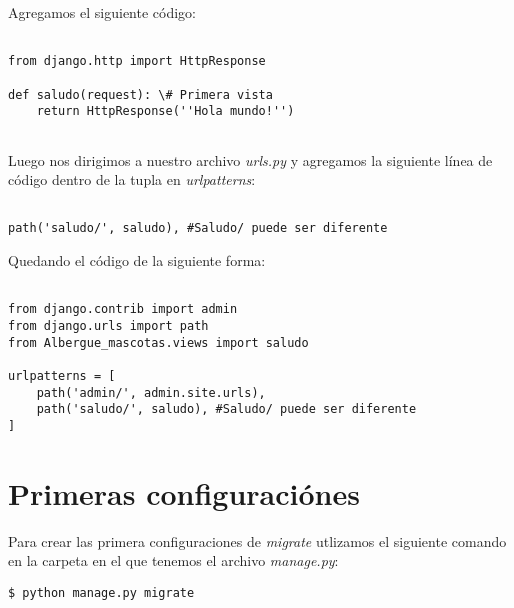 \documentclass[12pt,letterpaper]{article}
\begin{document}
Agregamos el siguiente código:\\



\lstset{language=python, breaklines=true, basicstyle=\footnotesize}
\begin{lstlisting}[frame=single]

from django.http import HttpResponse

def saludo(request): \# Primera vista
    return HttpResponse(''Hola mundo!'')
    
\end{lstlisting}




Luego nos dirigimos a nuestro archivo \emph{urls.py} y agregamos la siguiente línea de código dentro de la tupla en \emph{urlpatterns}:




\lstset{language=python, breaklines=true, basicstyle=\footnotesize}
\begin{lstlisting}[frame=single]

path('saludo/', saludo), #Saludo/ puede ser diferente

\end{lstlisting}

Quedando el código de la siguiente forma:\\

\lstset{language=python, breaklines=true, basicstyle=\footnotesize}
\begin{lstlisting}[frame=single]

from django.contrib import admin
from django.urls import path
from Albergue_mascotas.views import saludo

urlpatterns = [
    path('admin/', admin.site.urls),
    path('saludo/', saludo), #Saludo/ puede ser diferente
]

\end{lstlisting}

\section{Primeras configuraciónes}

Para crear las primera configuraciones de \emph{migrate} utlizamos el siguiente comando en la carpeta en el que tenemos el archivo \emph{manage.py}:\\

\begin{verbatim}
$ python manage.py migrate
\end{verbatim}
\end{document}
